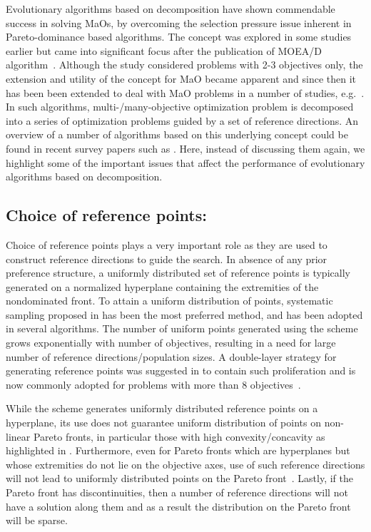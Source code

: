 Evolutionary algorithms based on decomposition have shown commendable success in solving MaOs, by overcoming the selection pressure issue inherent in Pareto-dominance based algorithms. The concept was explored in some studies earlier but came into significant focus after the publication of MOEA/D algorithm~\cite{zhang2007moead}. Although the study considered problems with 2-3 objectives only, the extension and utility of the concept for MaO became apparent and since then it has been been extended to deal with MaO problems in a number of studies, e.g.~\cite{Asafmany2015}. In such algorithms, multi-/many-objective optimization problem is decomposed into a series of optimization problems guided by a set of reference directions. An overview of a number of algorithms based on this underlying concept could be found in recent survey papers such as \cite{li2015many,lucken2014survey,trivedisurvey}. Here, instead of discussing them again, we highlight some of the important issues that affect the performance of evolutionary algorithms based on decomposition.

\subsection{Choice of reference points:} Choice of reference points plays a very important role as they are used to construct reference directions to guide the search. In absence of any prior preference structure, a uniformly distributed set of reference points is typically generated on a normalized hyperplane containing the extremities of the nondominated front. To attain a uniform distribution of points, systematic sampling proposed in \cite{das1998normal} has been the most preferred method, and has been adopted in several algorithms\cite{Asafmany2015,Deb2014box,Li2015dominance,Yuan2016many,Cheng2016many}. The number of uniform points generated using the scheme grows exponentially with number of objectives, resulting in a need for large number of reference directions/population sizes. A double-layer strategy for generating reference points was suggested in \cite{Deb2014box} to contain such proliferation and is now commonly adopted for problems with more than 8 objectives~\cite{Li2015dominance, Yuan2016many}.

While the scheme generates uniformly distributed reference points on a hyperplane, its use does not guarantee uniform distribution of points on non-linear Pareto fronts, in particular those with high convexity/concavity as highlighted in \cite{asaf2015char,Qi2014adaptive}. Furthermore, even for Pareto fronts which are hyperplanes but whose extremities do not lie on the objective axes, use of such reference directions will not lead to uniformly distributed points on the Pareto front~\cite{ishibuchi2016performance}. Lastly, if the Pareto front has discontinuities, then a number of reference directions will not have a solution along them and as a result the distribution on the Pareto front will be sparse. 

